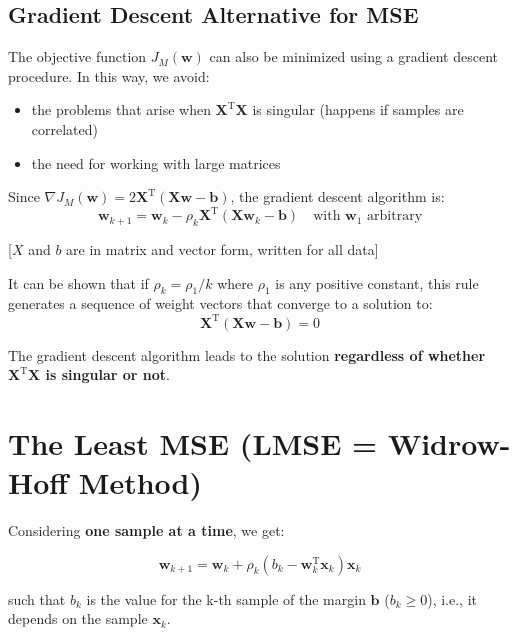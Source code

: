 \documentclass[11pt,a4paper]{article}
\theoremstyle{definition}
\theoremstyle{plain}
\theoremstyle{remark}
\begin{document}
\subsection{Gradient Descent Alternative for MSE}

The objective function $J_M(\mathbf{w})$ can also be minimized using a gradient descent procedure. In this way, we avoid:
\begin{itemize}
    \item the problems that arise when $\mathbf{X}^{\mathrm{T}} \mathbf{X}$ is singular (happens if samples are correlated)
    \item the need for working with large matrices
\end{itemize}

Since $\nabla J_M(\mathbf{w}) = 2 \mathbf{X}^{\mathrm{T}} (\mathbf{X}\mathbf{w} - \mathbf{b})$, the gradient descent algorithm is:
\[
\mathbf{w}_{k+1} = \mathbf{w}_k - \rho_k \mathbf{X}^{\mathrm{T}} (\mathbf{X}\mathbf{w}_k - \mathbf{b}) \quad \text{with } \mathbf{w}_1 \text{ arbitrary}
\]

[$X$ and $b$ are in matrix and vector form, written for all data]

\begin{tcolorbox}[colback=green!5!white,colframe=green!75!black,title=\textbf{Convergence Property}]
It can be shown that if $\rho_k = \rho_1/k$ where $\rho_1$ is any positive constant, this rule generates a sequence of weight vectors that converge to a solution to:
\[
\mathbf{X}^{\mathrm{T}} (\mathbf{X} \mathbf{w} - \mathbf{b}) = 0
\]

The gradient descent algorithm leads to the solution \textbf{regardless of whether $\mathbf{X}^{\mathrm{T}} \mathbf{X}$ is singular or not}.
\end{tcolorbox}

\section{The Least MSE (LMSE = Widrow-Hoff Method)}

Considering \textbf{one sample at a time}, we get:

\begin{tcolorbox}[colback=yellow!10!white,colframe=yellow!75!black,title=\textbf{LMS Rule}]
\[
\mathbf{w}_{k+1} = \mathbf{w}_k + \rho_k (b_k - \mathbf{w}_k^{\mathrm{T}} \mathbf{x}_k) \mathbf{x}_k
\]

such that $b_k$ is the value for the k-th sample of the margin $\mathbf{b}$ ($b_k \geq 0$), i.e., it depends on the sample $\mathbf{x}_k$.
\end{tcolorbox}
\end{document}
